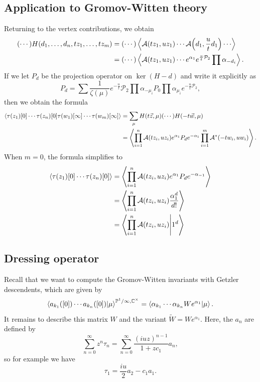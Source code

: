 \documentclass[leqno, openany]{memoir}
\theoremstyle{definition}
\theoremstyle{remark}
\theoremstyle{plain}
\theoremstyle{definition}
\theoremstyle{remark}
\newcommand{\C}{\mathbb{C}}
\renewcommand{\P}{\mathbb{P}}
\newcommand{\mc}[1]{\mathcal{#1}}
\newcommand{\wt}[1]{\widetilde{#1}}
\begin{document}
\subsection{Application to Gromov-Witten theory}

Returning to the vertex contributions, we obtain
\begin{align*}
    (\cdots) H(d_1, \ldots, d_n, tz_1, \ldots, tz_m) &= (\cdots) \ev{\mc{A}(tz_1, uz_1) \cdots \mc{A}\qty(d_1, \frac{u}{t}d_1) \cdots} \\
    &= (\cdots) \ev{\mc{A}(tz_1, uz_1) \cdots e^{\alpha_1} e^{\frac{u}{t} \mc{P}_2} \prod \alpha_{-d_i}}.
\end{align*}
If we let $P_d$ be the projection operator on $\ker(H-d)$ and write it explicitly as
\[ P_d = \sum \frac{1}{\zeta(\mu)} e^{-\frac{u}{t}} \mc{P}_2 \prod \alpha_{-\mu_i} P_0 \prod \alpha_{\mu_i} e^{-\frac{u}{t} \mc{P}_2}, \]
then we obtain the formula
\begin{align*}
    \ev{\tau(z_1)[0]\cdots\tau(z_n)[0]\tau(w_1)[\infty]\cdots\tau(w_m)[\infty]} &= \sum_{\mu} H(t \vec{z}, \mu) (\cdots) H(-t\vec{w}, \mu) \\
    &= \ev{\prod_{i=1}^n \mc{A}(tz_i, uz_i) e^{\alpha_1} P_d e^{-\alpha_1} \prod_{i=1}^m \mc{A}^*(-t w_i, uw_i)}.
\end{align*}
When $m = 0$, the formula simplifies to
\begin{align*}
    \ev{\tau(z_1)[0]\cdots\tau(z_n)[0]} &= \ev{\prod_{i=1}^n \mc{A}(tz_i, uz_i) e^{\alpha_1} P_d e^{-\alpha_{-1}}} \\
    &= \ev{\prod_{i=1}^n \mc{A}(tz_i, uz_i) \frac{\alpha_1^d}{d!}} \\
    &= \braket{\prod_{i=1}^n \mc{A}(tz_i, uz_i)}{1^d} \\
\end{align*}

\subsection{Dressing operator}

Recall that we want to compute the Gromov-Witten invariants with Getzler descendents, which are given by
\[ \braket{a_{k_1}([0]) \cdots a_{k_n}([0])}{\mu}^{\P^1/\infty, \C^{\times}} = \braket{\alpha_{k_1} \cdots \alpha_{k_n} W e^{\alpha_1}}{\mu}. \]
It remains to describe this matrix $W$ and the variant $\wt{W} = W e^{\alpha_{1}}$. Here, the $a_n$ are defined by
\[ \sum_{n=0}^{\infty} z^n \tau_n = \sum_{n=0}^{\infty} \frac{(iuz)^{n-1}}{1+zc_1} a_n, \]
so for example we have
\[ \tau_1 = \frac{iu}{2} a_2 - c_1 a_1. \]
\end{document}
